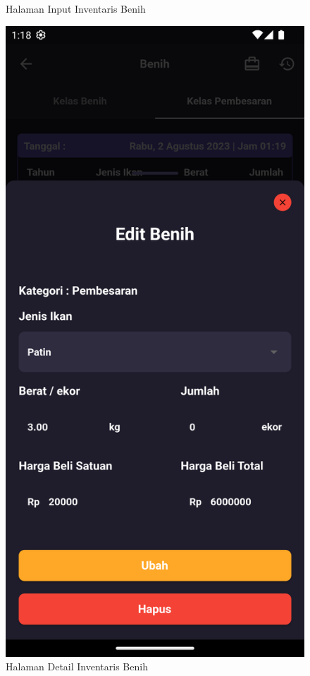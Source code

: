 \begin{spacing}{1.5}
\begin{enumerate}
\begin{figure}[H]
				\caption{Halaman Input Inventaris Benih}
			\endminipage\hfill
				\includegraphics[width=\linewidth]{gambar/sprint3/benih_3.png}
				\caption{Halaman Detail Inventaris Benih}
			\endminipage
		\end{figure}


\end{enumerate}
\end{spacing}
